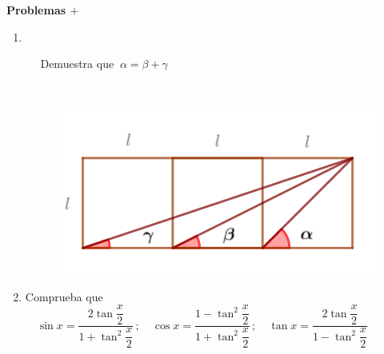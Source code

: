 

\newpage

\vspace{1cm}
\begin{adjustwidth}{50pt}{250pt}
\begin{cuadro-naranja}
\textbf{\huge{Problemas $\boldsymbol{+}$}}\normalsize{$\, $}
\end{cuadro-naranja}	
\end{adjustwidth}

\vspace{5mm}
\begin{enumerate}

\item	

\begin{multicols}{2}
$\quad$ 

$\quad$ Demuestra que $\ \alpha=\beta+\gamma$

$\quad$
\begin{figure}[H]
	\centering
	\includegraphics[width=.4\textwidth]{img-ft/ft09.png}
	\end{figure}		
\end{multicols}


\vspace{-12mm}
\begin{flushright}
\begin{footnotesize} \textcolor{gris}{}	\end{footnotesize}
\end{flushright}


\item	Comprueba que $\quad \sin x=\dfrac {2\tan \dfrac x 2 }{1+\tan^2 \dfrac x 2}\, ; \quad \cos x =\dfrac {1-\tan^2 \dfrac x 2 }{1+\tan^2 \dfrac x 2}\, ; \quad \tan x=\dfrac {2\tan \dfrac x 2 }{1-\tan^2 \dfrac x 2}$

\vspace{-2mm}
\begin{flushright}
\begin{footnotesize} \textcolor{gris}{}	\end{footnotesize}
\end{flushright}



\end{enumerate}
